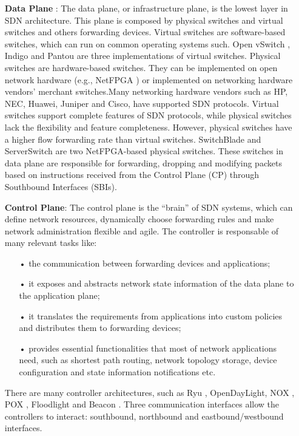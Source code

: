 \begin{itemize}
\item[] \textbf{Data Plane} : The data plane, or infrastructure plane, is the lowest layer in SDN architecture. This plane is composed by physical switches and virtual switches and others forwarding devices. Virtual switches are software-based switches, which can run on common operating systems such. Open vSwitch \cite{OVS}, Indigo \cite{Indigo} and Pantou \cite{Pantou} are three implementations of virtual switches. Physical switches are hardware-based switches. They can be implemented on open network hardware (e.g., NetFPGA \cite{Lockwood2007}) or implemented on networking hardware vendors’ merchant switches.Many networking hardware vendors such as HP, NEC, Huawei, Juniper and Cisco, have supported SDN protocols. Virtual switches support complete features of SDN protocols, while physical switches lack the flexibility and feature completeness. However, physical switches have a higher flow forwarding rate than virtual switches.  SwitchBlade \cite{Anwer2010} and ServerSwitch \cite{Lu2011} are two NetFPGA-based physical switches.
These switches in data plane are responsible for forwarding, dropping and modifying packets based on instructions received from the Control Plane (CP) through Southbound Interfaces (SBIs).
\item[] \textbf{Control Plane}: The control plane is the “brain” of SDN systems, which can define network resources, dynamically choose forwarding rules and make network administration flexible and agile. The controller is responsable of many relevant tasks like:
\begin{itemize}
\item[•] the communication between forwarding devices and applications;
\item[•] it exposes and abstracts network state information of the data plane to the application plane;
\item[•] it translates the requirements from applications into custom policies and distributes them to forwarding devices;
\item[•] provides essential functionalities that most of network applications need, such as shortest path routing, network topology storage, device configuration and state information notifications etc.
\end{itemize}
There are many controller architectures, such as Ryu \cite{RYU}, OpenDayLight, \cite{Medved2014} NOX \cite{NOX}, POX \cite{POX}, Floodlight \cite{Floodlight} and Beacon \cite{Erickson2013}. Three communication interfaces allow the controllers to interact: southbound, northbound and eastbound/westbound interfaces.

\end{itemize}
